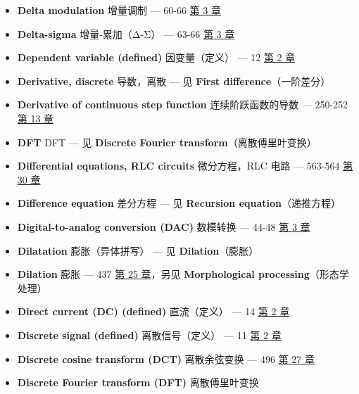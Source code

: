 \begin{itemize}
  \begin{itemize}
  \tightlist
  \item
    continuous：连续冲激函数 --- 243-245  \hyperref[ch-13]{第
    13 章}
  \item
    discrete：离散冲激函数 --- 107-109  \hyperref[ch-06]{第 6
    章}
  \item
    Fourier transform of：其傅里叶变换 --- 200 
    \hyperref[ch-10]{第 10 章}；209-212  \hyperref[ch-11]{第
    11 章}
  \item
    identity for convolution：卷积的单位元 --- 123 
    \hyperref[ch-07]{第 7 章}
  \item
    two-dimensional (image)：二维（图像） --- 397-398 
    \hyperref[ch-24]{第 24 章}
  \end{itemize}
\item
  \textbf{Delta modulation} 增量调制 --- 60-66 
  \hyperref[ch-03]{第 3 章}
\item
  \textbf{Delta-sigma} 增量-累加（Δ-Σ） --- 63-66 
  \hyperref[ch-03]{第 3 章}
\item
  \textbf{Dependent variable (defined)} 因变量（定义） --- 12 
  \hyperref[ch-02]{第 2 章}
\item
  \textbf{Derivative, discrete} 导数，离散 --- 见 \textbf{First
  difference}（一阶差分）
\item
  \textbf{Derivative of continuous step function} 连续阶跃函数的导数 ---
  250-252  \hyperref[ch-13]{第 13 章}
\item
  \textbf{DFT} DFT --- 见 \textbf{Discrete Fourier
  transform}（离散傅里叶变换）
\item
  \textbf{Differential equations, RLC circuits} 微分方程，RLC 电路 ---
  563-564  \hyperref[ch-30]{第 30 章}
\item
  \textbf{Difference equation} 差分方程 --- 见 \textbf{Recursion
  equation}（递推方程）
\item
  \textbf{Digital-to-analog conversion (DAC)} 数模转换 --- 44-48
   \hyperref[ch-03]{第 3 章}
\item
  \textbf{Dilatation} 膨胀（异体拼写） --- 见 \textbf{Dilation}（膨胀）
\item
  \textbf{Dilation} 膨胀 --- 437  \hyperref[ch-25]{第 25
  章}，另见 \textbf{Morphological processing}（形态学处理）
\item
  \textbf{Direct current (DC) (defined)} 直流（定义） --- 14 
  \hyperref[ch-02]{第 2 章}
\item
  \textbf{Discrete signal (defined)} 离散信号（定义） --- 11 
  \hyperref[ch-02]{第 2 章}
\item
  \textbf{Discrete cosine transform (DCT)} 离散余弦变换 --- 496
   \hyperref[ch-27]{第 27 章}
\item
  \textbf{Discrete Fourier transform (DFT)} 离散傅里叶变换


\end{itemize}
